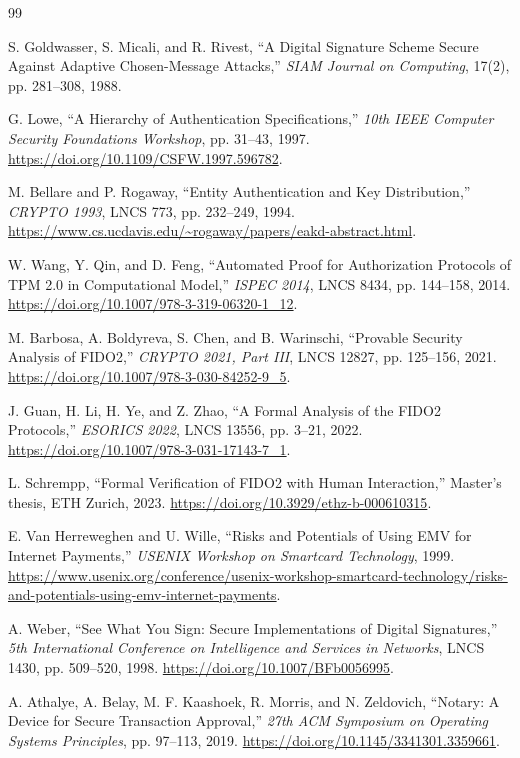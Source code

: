 \documentclass[10pt]{article}
\begin{document}
\begin{thebibliography}{99}

S. Goldwasser, S. Micali, and R. Rivest,
``A Digital Signature Scheme Secure Against Adaptive Chosen-Message Attacks,''
\emph{SIAM Journal on Computing}, 17(2), pp. 281--308, 1988.

G. Lowe,
``A Hierarchy of Authentication Specifications,''
\emph{10th IEEE Computer Security Foundations Workshop}, pp. 31--43, 1997.
\url{https://doi.org/10.1109/CSFW.1997.596782}.

M. Bellare and P. Rogaway,
``Entity Authentication and Key Distribution,''
\emph{CRYPTO 1993}, LNCS 773, pp. 232--249, 1994.
\url{https://www.cs.ucdavis.edu/~rogaway/papers/eakd-abstract.html}.

W. Wang, Y. Qin, and D. Feng,
``Automated Proof for Authorization Protocols of TPM 2.0 in Computational
Model,'' \emph{ISPEC 2014}, LNCS 8434, pp. 144--158, 2014.
\url{https://doi.org/10.1007/978-3-319-06320-1_12}.

M. Barbosa, A. Boldyreva, S. Chen, and B. Warinschi,
``Provable Security Analysis of FIDO2,''
\emph{CRYPTO 2021, Part III}, LNCS 12827, pp. 125--156, 2021.
\url{https://doi.org/10.1007/978-3-030-84252-9_5}.

J. Guan, H. Li, H. Ye, and Z. Zhao,
``A Formal Analysis of the FIDO2 Protocols,''
\emph{ESORICS 2022}, LNCS 13556, pp. 3--21, 2022.
\url{https://doi.org/10.1007/978-3-031-17143-7_1}.

L. Schrempp,
``Formal Verification of FIDO2 with Human Interaction,''
Master's thesis, ETH Zurich, 2023.
\url{https://doi.org/10.3929/ethz-b-000610315}.

E. Van Herreweghen and U. Wille,
``Risks and Potentials of Using EMV for Internet Payments,''
\emph{USENIX Workshop on Smartcard Technology}, 1999.
\url{https://www.usenix.org/conference/usenix-workshop-smartcard-technology/risks-and-potentials-using-emv-internet-payments}.

A. Weber,
``See What You Sign: Secure Implementations of Digital Signatures,''
\emph{5th International Conference on Intelligence and Services in Networks},
LNCS 1430, pp. 509--520, 1998.
\url{https://doi.org/10.1007/BFb0056995}.

A. Athalye, A. Belay, M. F. Kaashoek, R. Morris, and N. Zeldovich,
``Notary: A Device for Secure Transaction Approval,''
\emph{27th ACM Symposium on Operating Systems Principles}, pp. 97--113, 2019.
\url{https://doi.org/10.1145/3341301.3359661}.


\end{thebibliography}
\end{document}
